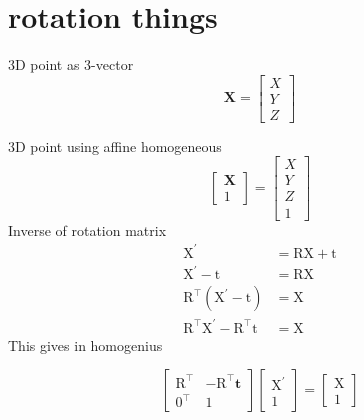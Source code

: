 \documentclass[a4paper]{article}
\begin{document}
\section{rotation things}
\label{sec-8}


3D point as 3-vector
$$
\mathbf{X}=\left[\begin{array}{l}{X} \\ {Y} \\ {Z}\end{array}\right]
$$

3D point using affine homogeneous
$$
\left[\begin{array}{l}{\mathbf{X}} \\ {1}\end{array}\right]=\left[\begin{array}{l}{X} \\ {Y} \\ {Z} \\ {1}\end{array}\right]
$$
Inverse of rotation matrix
\begin{equation}
\begin{aligned} \mathrm{X}^{\prime} &=\mathrm{RX}+\mathrm{t} \\
 \mathrm{X}^{\prime}-\mathrm{t} &=\mathrm{RX} \\ 
\mathrm{R}^{\top}\left(\mathrm{X}^{\prime}-\mathrm{t}\right) &=\mathrm{X} \\
 \mathrm{R}^{\top} \mathrm{X}^{\prime}-\mathrm{R}^{\top} \mathrm{t} &=\mathrm{X} 
\end{aligned}
\end{equation}
This gives in homogenius

$$
\left[\begin{array}{cc}{\mathrm{R}^{\top}} & {-\mathrm{R}^{\top} \mathbf{t}} \\ {0^{\top}} & {1}\end{array}\right]\left[\begin{array}{l}{\mathrm{X}^{\prime}} \\ {1}\end{array}\right]=\left[\begin{array}{l}{\mathrm{X}} \\ {1}\end{array}\right]
$$
\end{document}
